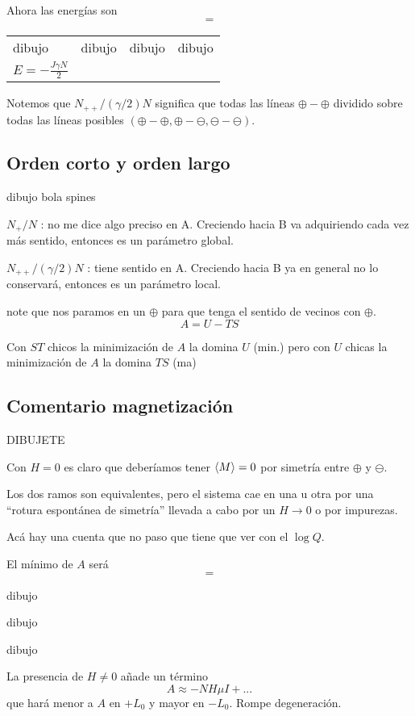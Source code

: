\documentclass[10pt,oneside]{CBFT_book}
\begin{document}
Ahora las energías son
\[=\]
\begin{center}
\begin{tabular}{l|l|l|l}
dibujo & dibujo & dibujo & dibujo \\
 $E=-\frac{J\gamma N}{2}$ & & & 
\end{tabular}
\end{center}

Notemos que $N_{++}/(\gamma/2)N$ significa que todas las líneas $\oplus - \oplus$ dividido sobre todas
las líneas posibles $(\oplus - \oplus, \oplus - \ominus, \ominus - \ominus)$.

\subsection{Orden corto y orden largo}

dibujo bola spines

$N_+ / N$ : no me dice algo preciso en A. Creciendo hacia B va adquiriendo cada vez más sentido, entonces
es un parámetro global.

$N_{++}/(\gamma/2)N$ : tiene sentido en A. Creciendo hacia B ya en general no lo conservará, entonces es
un parámetro local.

 note que nos paramos en un $\oplus$ para que tenga el sentido de
vecinos con $\oplus$.
\[
	A = U - TS
\]

Con $ST$ chicos la minimización de $A$ la domina $U$ (min.) pero con $U$ chicas la minimización de $A$ la domina
$TS$ (ma)

\subsection{Comentario magnetización}

DIBUJETE

Con $H=0$ es claro que deberíamos tener $ \braket{M}=0 $ por simetría entre $\oplus$ y $\ominus$.

Los dos ramos son equivalentes, pero el sistema cae en una u otra por una ``rotura espontánea de simetría''
llevada a cabo por un $ H \to 0 $ o por impurezas.

Acá hay una cuenta que no paso que tiene que ver con el $ \log Q $.

El mínimo de $A$ será 
\[ = \]

dibujo

dibujo

dibujo

La presencia de $ H \neq 0 $ añade un término 
\[
	A \approx - N H \mu I + ...
\]
que hará menor a $ A $ en $ + L_0 $ y mayor en $ - L_0 $. Rompe degeneración.
\end{document}
